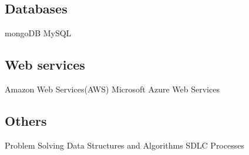 \documentclass[]{rohan-resume-openfont}
\begin{document}
\begin{minipage}[t]{0.66\textwidth}
\subsection{Databases}
\textbullet{} mongoDB \textbullet{} MySQL
\sectionsep
\subsection{Web services}
\textbullet{} Amazon Web Services(AWS) \textbullet{} Microsoft Azure Web Services
\sectionsep
\subsection{Others}
\textbullet{} Problem Solving \textbullet{} Data Structures and Algorithms \textbullet{} SDLC Processes \\ 
\sectionsep




\end{minipage} 
\end{document}
